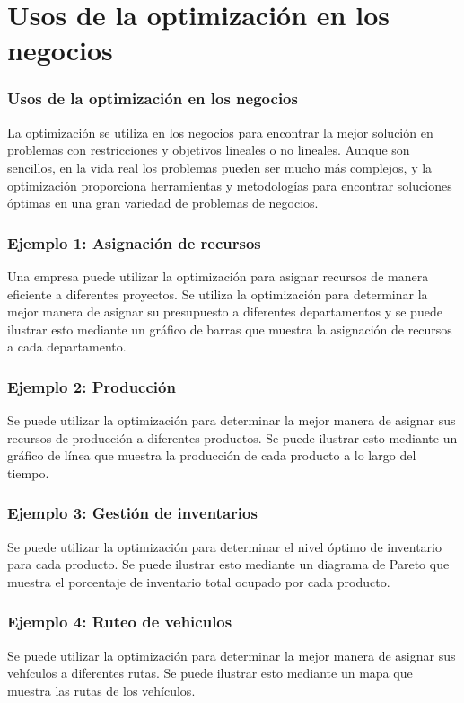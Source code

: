 \documentclass{beamer}
\begin{document}
\section{Usos de la optimización en los negocios}

\begin{frame}
    \frametitle{Usos de la optimización en los negocios}
    
    La optimización se utiliza en los negocios para encontrar la mejor solución en problemas con restricciones y objetivos lineales o no lineales. Aunque son sencillos, en la vida real los problemas pueden ser mucho más complejos, y la optimización proporciona herramientas y metodologías para encontrar soluciones óptimas en una gran variedad de problemas de negocios.
    
\end{frame}

\begin{frame}
    \frametitle{Ejemplo 1: Asignación de recursos}
    
    Una empresa puede utilizar la optimización para asignar recursos de manera eficiente a diferentes proyectos. 
    Se utiliza la optimización para determinar la mejor manera de asignar su presupuesto a diferentes departamentos 
    y se puede ilustrar esto mediante un gráfico de barras que muestra la asignación de recursos a cada departamento.
\end{frame}
    
\begin{frame}
    \frametitle{Ejemplo 2: Producción}
    
    Se puede utilizar la optimización para determinar la mejor manera de asignar sus recursos de producción a diferentes productos. Se puede ilustrar esto mediante un gráfico de línea que muestra la producción de cada producto a lo largo del tiempo.
    

\end{frame}

\begin{frame}
    \frametitle{Ejemplo 3: Gestión de inventarios}
    
        Se  puede utilizar la optimización para determinar el nivel óptimo de inventario para cada producto. Se puede ilustrar esto mediante un diagrama de Pareto que muestra el porcentaje de inventario total ocupado por cada producto.
\end{frame}

\begin{frame}
    \frametitle{Ejemplo 4: Ruteo de vehiculos}
    
    Se puede utilizar la optimización para determinar la mejor manera de asignar sus vehículos a diferentes rutas. Se puede ilustrar esto mediante un mapa que muestra las rutas de los vehículos.

\end{frame}
\end{document}
